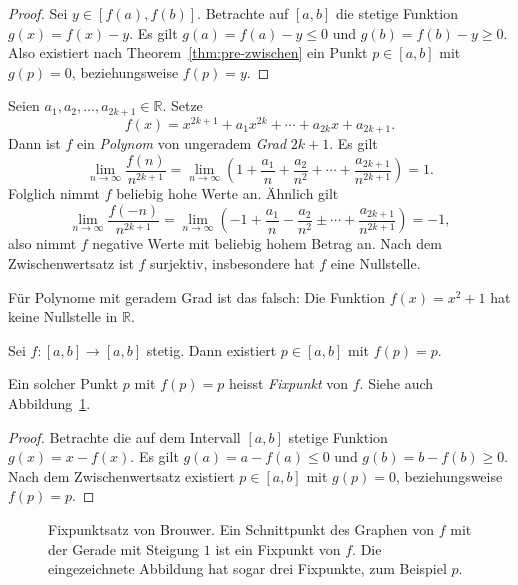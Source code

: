 \documentclass[../main.tex]{subfiles}
\begin{document}
\begin{proof}
  Sei $y \in [f(a), f(b)]$. Betrachte
  auf $[a, b]$ die stetige Funktion
  $g(x) = f(x) - y$.
  Es gilt $g(a) = f(a) - y \leq 0$ und
  $g(b) = f(b) - y \geq 0$.
  Also existiert nach Theorem~\ref{thm:pre-zwischen}
  ein Punkt $p \in [a, b]$ mit $g(p) = 0$,
  beziehungsweise $f(p) = y$.
\end{proof}

\begin{example}
  Seien $a_1, a_2, \dots, a_{2k + 1} \in \mathbb{R}$.
  Setze
  \[
  f(x) = x^{2k+1} + a_1 x^{2k}
  + \cdots + a_{2k}x + a_{2k+1}.
  \]
  Dann ist $f$ ein \emph{Polynom} von ungeradem
  \emph{Grad} $2k + 1$. Es gilt
  \[
    \lim_{n \to \infty} \frac{f(n)}{n^{2k+1}}
    = \lim_{n \to \infty}
    \left( 1 + \frac{a_1}{n} + \frac{a_2}{n^2}
    + \cdots + \frac{a_{2k+1}}{n^{2k+1}}\right) = 1.
  \]
  Folglich nimmt $f$ beliebig hohe Werte an.
  Ähnlich gilt
  \[
    \lim_{n \to \infty} \frac{f(-n)}{n^{2k+1}}
    = \lim_{n \to \infty}
    \left( -1 + \frac{a_1}{n} - \frac{a_2}{n^2}
    \pm \cdots + \frac{a_{2k+1}}{n^{2k+1}}\right) = -1,
  \]
  also nimmt $f$ negative Werte
  mit beliebig hohem Betrag an.
  Nach dem Zwischenwertsatz 
  ist $f$ surjektiv, insbesondere hat $f$ eine Nullstelle.
\end{example}

\begin{remark}
  Für Polynome mit geradem Grad ist das falsch:
  Die Funktion $f(x) = x^2 + 1$ hat keine Nullstelle
  in $\mathbb{R}$.
\end{remark}

\begin{brouwer}
  Sei $f \colon [a, b] \to [a, b]$ stetig.
  Dann existiert $p \in [a, b]$ mit $f(p) = p$.
\end{brouwer}

Ein solcher Punkt $p$ mit $f(p) = p$ heisst \emph{Fixpunkt}
von $f$. Siehe auch Abbildung~\ref{fig:brouwer}.

\begin{proof}
  Betrachte die auf dem Intervall
  $[a, b]$ stetige Funktion
  $g(x) = x - f(x)$.
  Es gilt
  $
    g(a) = a - f(a) \leq 0$
    und
    $g(b) = b - f(b) \geq 0$.
  Nach dem Zwischenwertsatz existiert
  $p \in [a,b]$ mit $g(p) = 0$,
  beziehungsweise $f(p) = p$.
\end{proof}

\begin{figure}[htb]
  \centering
  
  \caption{Fixpunktsatz von Brouwer.
  Ein Schnittpunkt des Graphen von $f$ mit
der Gerade mit Steigung $1$ ist ein
Fixpunkt von $f$. Die eingezeichnete Abbildung
hat sogar drei Fixpunkte, zum Beispiel $p$.}%
  \label{fig:brouwer}
\end{figure}
\end{document}
